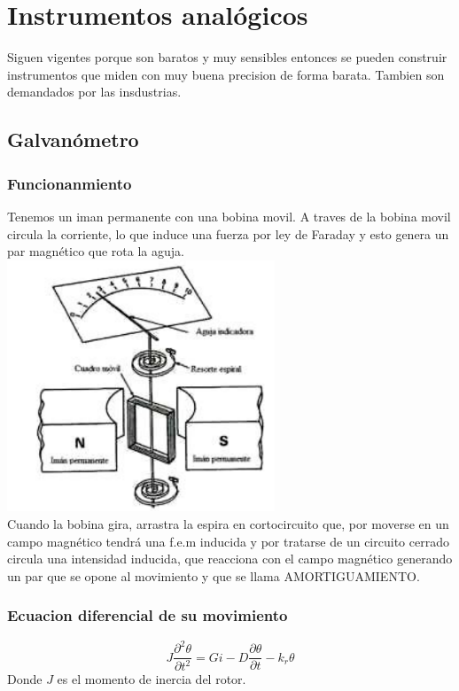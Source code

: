 \documentclass{report}
\begin{document}
\chapter{Instrumentos analógicos}

Siguen vigentes porque son baratos y muy sensibles entonces se pueden construir instrumentos que miden con muy buena precision de forma barata.
Tambien son demandados por las insdustrias.

\section{Galvanómetro}

\subsection{Funcionanmiento}
Tenemos un iman permanente con una bobina movil. A traves de la bobina movil circula la corriente, lo que induce una fuerza por ley de Faraday y esto genera un par magnético que rota la aguja. \\
\includegraphics[width=8cm]{../Assets/galvanometro.png} \\
Cuando la bobina gira, arrastra la espira en cortocircuito que, por moverse en un campo magnético tendrá una f.e.m inducida y por tratarse de un circuito cerrado circula una intensidad inducida, que reacciona con el campo magnético generando un par que se opone al movimiento y que se llama AMORTIGUAMIENTO.

\subsection{Ecuacion diferencial de su movimiento}
\[
	J \frac{\partial^2{\theta}}{\partial{t^2}} = Gi - D \frac{\partial{\theta}}{\partial{t}} - k_r\theta
\]
Donde $J$ es el momento de inercia del rotor.
\end{document}
